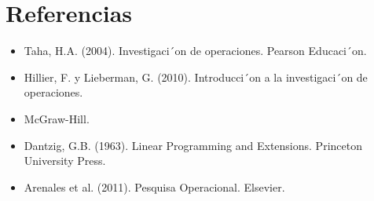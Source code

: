 \documentclass[12pt]{article}
\begin{document}
  \section{Referencias}
  \begin{itemize}
      
\item Taha, H.A. (2004). Investigaci´on de operaciones. Pearson Educaci´on.
\item Hillier, F. y Lieberman, G. (2010). Introducci´on a la investigaci´on de operaciones.
\item McGraw-Hill.
\item Dantzig, G.B. (1963). Linear Programming and Extensions. Princeton University Press.
\item Arenales et al. (2011). Pesquisa Operacional. Elsevier.
 \end{itemize}
 \newpage
 
\end{document}
